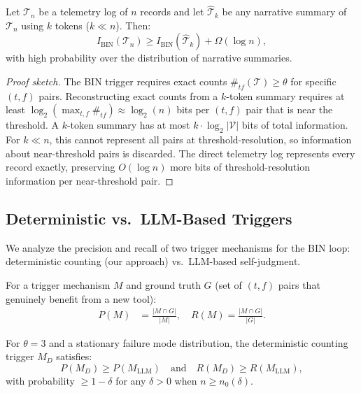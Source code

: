 \begin{theorem}
\label{thm:entropy}
Let $\mathcal{T}_n$ be a telemetry log of $n$ records and let $\hat{\mathcal{T}}_k$ be
any narrative summary of $\mathcal{T}_n$ using $k$ tokens ($k \ll n$). Then:
\begin{equation}
I_{\text{BIN}}(\mathcal{T}_n) \geq I_{\text{BIN}}(\hat{\mathcal{T}}_k) + \Omega\!\left(\log n\right),
\end{equation}
with high probability over the distribution of narrative summaries.
\end{theorem}

\begin{proof}[Proof sketch]
The BIN trigger requires exact counts $\#_{tf}(\mathcal{T}) \geq \theta$ for
specific $(t,f)$ pairs. Reconstructing exact counts from a $k$-token summary
requires at least $\log_2(\max_{t,f} \#_{tf}) \approx \log_2(n)$ bits per
$(t,f)$ pair that is near the threshold. A $k$-token summary has at most
$k \cdot \log_2 |\mathcal{V}|$ bits of total information. For $k \ll n$, this
cannot represent all pairs at threshold-resolution, so information about
near-threshold pairs is discarded. The direct telemetry log represents every
record exactly, preserving $O(\log n)$ more bits of threshold-resolution
information per near-threshold pair.
\end{proof}

\subsection{Deterministic vs.\ LLM-Based Triggers}
\label{sec:triggers}

We analyze the precision and recall of two trigger mechanisms for the BIN loop:
deterministic counting (our approach) vs.\ LLM-based self-judgment.

\begin{definition}
\label{def:precision_recall}
For a trigger mechanism $M$ and ground truth $G$ (set of $(t,f)$ pairs that
genuinely benefit from a new tool):
\begin{align}
P(M) &= \frac{|M \cap G|}{|M|}, \quad R(M) = \frac{|M \cap G|}{|G|}.
\end{align}
\end{definition}

\begin{proposition}
\label{prop:trigger_dominance}
For $\theta = 3$ and a stationary failure mode distribution, the deterministic
counting trigger $M_D$ satisfies:
\begin{equation}
P(M_D) \geq P(M_{\text{LLM}}) \quad \text{and} \quad R(M_D) \geq R(M_{\text{LLM}}),
\end{equation}
with probability $\geq 1 - \delta$ for any $\delta > 0$ when $n \geq n_0(\delta)$.
\end{proposition}

